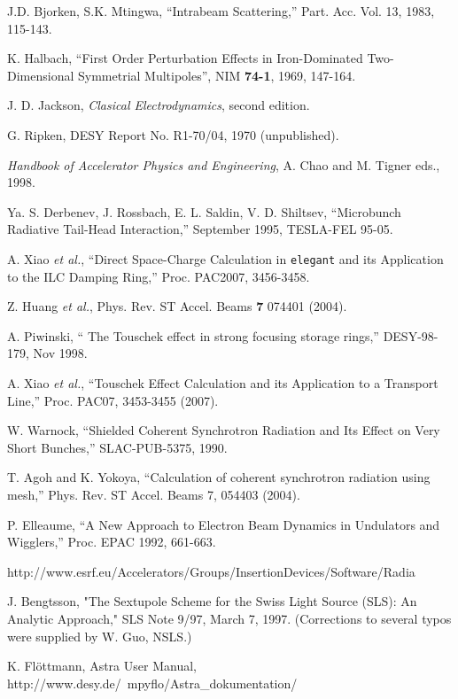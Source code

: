 \documentclass[11pt]{article}
\begin{document}
\begin{thebibliography}{9}
  J.D. Bjorken, S.K. Mtingwa, ``Intrabeam Scattering,'' Part. Acc. Vol. 13, 
  1983, 115-143.

    K. Halbach, ``First Order Perturbation Effects in Iron-Dominated Two-Dimensional Symmetrial Multipoles'',
    NIM {\bf 74-1}, 1969, 147-164.

  J. D. Jackson, {\em Clasical Electrodynamics}, second edition.

 G. Ripken, DESY Report No. R1-70/04, 1970 (unpublished).

  {\em Handbook of Accelerator Physics and Engineering}, A. Chao and M. Tigner eds., 1998.

  Ya. S. Derbenev, J. Rossbach, E. L. Saldin, V. D. Shiltsev, ``Microbunch Radiative Tail-Head
  Interaction,'' September 1995, TESLA-FEL 95-05.

  A. Xiao {\em et al.}, ``Direct Space-Charge Calculation in {\tt elegant} and its Application to the
 ILC Damping Ring,'' Proc. PAC2007, 3456-3458.

  Z. Huang {\em et al.}, Phys. Rev. ST Accel. Beams {\bf 7} 074401 (2004).

  A. Piwinski, `` The Touschek effect in strong focusing storage rings,'' DESY-98-179, Nov 1998.

  A. Xiao {\em et al.}, ``Touschek Effect Calculation and its Application to a Transport Line,''
  Proc. PAC07, 3453-3455 (2007).

  W. Warnock, ``Shielded Coherent Synchrotron Radiation and Its Effect on Very Short Bunches,'' SLAC-PUB-5375, 1990.

  T. Agoh and K. Yokoya, ``Calculation of coherent synchrotron radiation using mesh,'' Phys. Rev. ST Accel. Beams 7,
  054403 (2004).

  P. Elleaume, ``A New Approach to Electron Beam Dynamics in Undulators and Wigglers,'' Proc. EPAC 1992, 661-663.

  http://www.esrf.eu/Accelerators/Groups/InsertionDevices/Software/Radia

 J. Bengtsson, "The Sextupole Scheme for the Swiss Light Source (SLS): An Analytic Approach," SLS Note 9/97,
 March 7, 1997. (Corrections to several typos were supplied by W. Guo, NSLS.)

  K. Fl\"{o}ttmann, Astra User Manual, http://www.desy.de/~mpyflo/Astra\_dokumentation/


\end{thebibliography}
\end{document}
